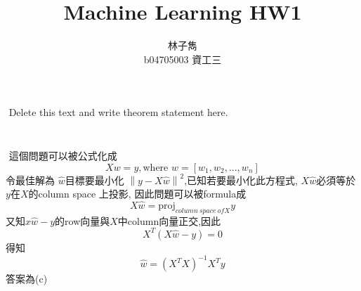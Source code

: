 \documentclass[12pt]{article}
\newcommand{\norm}[1]{\left\lVert#1\right\rVert}
\newenvironment{problem}[2][Problem]{\begin{trivlist}
\item[\hskip \labelsep {\bfseries #1}\hskip \labelsep {\bfseries #2.}]}{\end{trivlist}}
\begin{document}
\begin{CJK}{UTF8}{bsmi}
 
 
\title{Machine Learning HW1}%
\author{林子雋\\ %
b04705003 資工三} %
\date{} %
\maketitle
 
\begin{problem}{1. 記錄誤差值 (RMSE)(根據kaggle public+private分數),討論兩種feature的影響}
$ $\newline 
Delete this text and write theorem statement here.
\end{problem}
 
\begin{problem}{2. 將feature從抽前9小時改成抽前5小時，討論其變化} 
$ $\newline
\end{problem}
\begin{problem}{3. Regularization on all the weight with λ=0.1、0.01、0.001、0.0001，並作圖} 
$ $\newline
\end{problem}
\begin{problem}{4. 線性回歸問題,請寫下算式並選出正確答案}
$ $\newline
這個問題可以被公式化成 
	$$ Xw = y, \text{where }w = [w_{1}, w_{2}, ..., w_{n}] $$
令最佳解為 $\hat{w}$目標要最小化 $\norm{y - X\hat{w}}^2 $,已知若要最小化此方程式, $X\hat{w}$必須等於$y$在$X$的column space 上投影, 因此問題可以被formula成
	$$  X\hat{w} = \text{proj}_{column\ space\  of X}y $$
又知$x\hat{w}-y$的row向量與$X$中column向量正交,因此
	$$ X^{T}(X\hat{w}-y) = 0$$
得知
	$$ \hat{w} = (X^{T}X)^{-1}X^{T}y $$
答案為(c)
\end{problem}


\end{CJK} 
\end{document}
